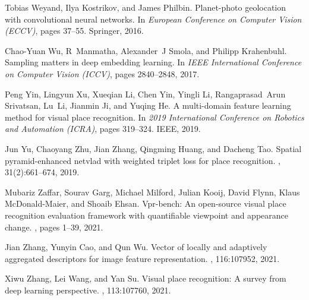 \documentclass{article}
\begin{document}
\begin{thebibliography}{99}
Tobias Weyand, Ilya Kostrikov, and James Philbin.
\newblock Planet-photo geolocation with convolutional neural networks.
\newblock In {\em European Conference on Computer Vision (ECCV)}, pages 37--55.
  Springer, 2016.

Chao-Yuan Wu, R~Manmatha, Alexander~J Smola, and Philipp Krahenbuhl.
\newblock Sampling matters in deep embedding learning.
\newblock In {\em IEEE International Conference on Computer Vision (ICCV)},
  pages 2840--2848, 2017.

Peng Yin, Lingyun Xu, Xueqian Li, Chen Yin, Yingli Li, Rangaprasad~Arun
  Srivatsan, Lu~Li, Jianmin Ji, and Yuqing He.
\newblock A multi-domain feature learning method for visual place recognition.
\newblock In {\em 2019 International Conference on Robotics and Automation
  (ICRA)}, pages 319--324. IEEE, 2019.

Jun Yu, Chaoyang Zhu, Jian Zhang, Qingming Huang, and Dacheng Tao.
\newblock Spatial pyramid-enhanced netvlad with weighted triplet loss for place
  recognition.
,
  31(2):661--674, 2019.

Mubariz Zaffar, Sourav Garg, Michael Milford, Julian Kooij, David Flynn, Klaus
  McDonald-Maier, and Shoaib Ehsan.
\newblock Vpr-bench: An open-source visual place recognition evaluation
  framework with quantifiable viewpoint and appearance change.
, pages 1--39, 2021.

Jian Zhang, Yunyin Cao, and Qun Wu.
\newblock Vector of locally and adaptively aggregated descriptors for image
  feature representation.
, 116:107952, 2021.

Xiwu Zhang, Lei Wang, and Yan Su.
\newblock Visual place recognition: A survey from deep learning perspective.
, 113:107760, 2021.

\end{thebibliography}
\end{document}
